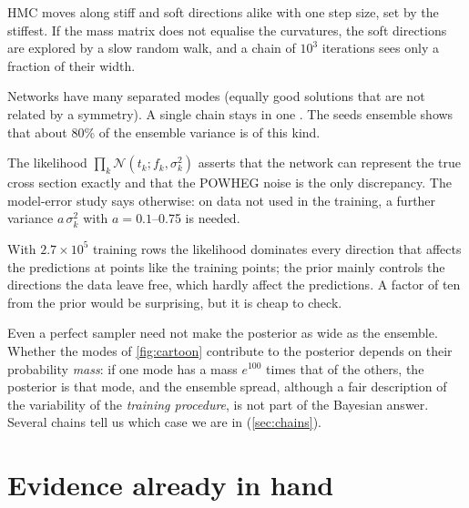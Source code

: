 \begin{description}[leftmargin=1.2em]
  \item[A. Poor sampling within a mode.] HMC moves along stiff and soft directions alike
    with one step size, set by the stiffest. If the mass matrix does not equalise the
    curvatures, the soft directions are explored by a slow random walk, and a chain of
    $10^3$ iterations sees only a fraction of their width.
  \item[B. Modes not visited.] Networks have many separated modes (equally good solutions
    that are not related by a symmetry). A single chain stays in one
    \cite{Izmailov:2021}. The seeds ensemble
    shows that about 80\% of the ensemble variance is of this kind.
  \item[C. An over-confident likelihood.] The likelihood $\prod_k
    \mathcal{N}(t_k; f_k, \sigma_k^2)$ asserts that the network can represent the true
    cross section exactly and that the POWHEG noise is the only discrepancy. The model-error
    study says otherwise: on data not used in the training, a further variance
    $a\,\sigma_k^2$ with $a = 0.1$--0.75 is needed.
  \item[D. The prior.] With $2.7\times10^5$ training rows the likelihood dominates every
    direction that affects the predictions at points like the training points; the prior
    mainly controls the directions the data leave free, which hardly affect the predictions.
    A factor of ten from the prior would be surprising, but it is cheap to check.
\end{description}

\begin{watch}
Even a perfect sampler need not make the posterior as wide as the ensemble. Whether the
modes of \cref{fig:cartoon} contribute to the posterior depends on their probability
\emph{mass}: if one mode has a mass $e^{100}$ times that of the others, the posterior is
that mode, and the ensemble spread, although a fair description of the variability of the
\emph{training procedure}, is not part of the Bayesian answer. Several chains tell us which
case we are in (\cref{sec:chains}).
\end{watch}

\section{Evidence already in hand}
\label{sec:evidence}

